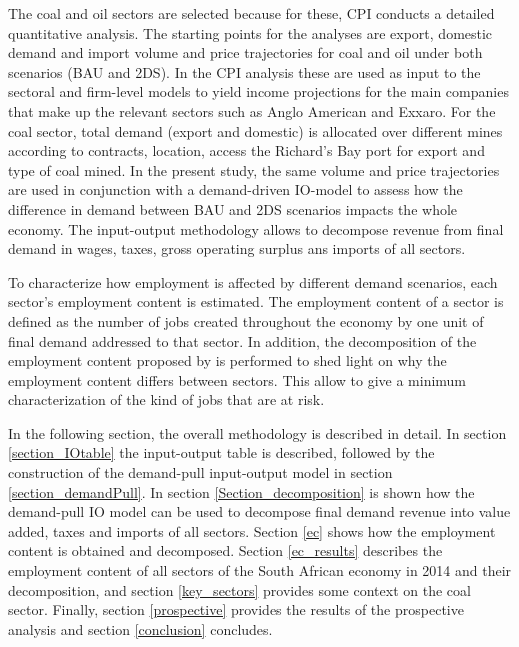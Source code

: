 \documentclass[12pt,english]{article}
\begin{document}
The coal and oil sectors are selected because for these, CPI conducts a detailed quantitative analysis. %
The starting points for the analyses are export, domestic demand and import volume and price trajectories for coal and oil under both scenarios (BAU and 2DS). In the CPI analysis these are used as input to the sectoral and firm-level models to yield income projections for the main companies that make up the relevant sectors such as Anglo American and Exxaro. For the coal sector, total demand (export and domestic) is allocated over different mines according to contracts, location, access the Richard's Bay port for export and type of coal mined. In the present study, the same volume and price trajectories are used in conjunction with a demand-driven IO-model to assess how the difference in demand between BAU and 2DS scenarios impacts the whole economy. The input-output methodology allows to decompose revenue from final demand in wages, taxes, gross operating surplus ans imports of all sectors.

To characterize how employment is affected by different demand scenarios, each sector's employment content is estimated. The employment content of a sector is defined as the number of jobs created throughout the economy by one unit of final demand addressed to that sector. In addition, the decomposition of the employment content proposed by \citep{perrier2017transition} is performed to shed light on why the employment content differs between sectors. This allow to give a minimum characterization of the kind of jobs that are at risk.

In the following section, the overall methodology is described in detail. In section \ref{section_IOtable} the input-output table is described, followed by the construction of the demand-pull input-output model in section \ref{section_demandPull}. In section \ref{Section_decomposition} is shown how the demand-pull IO model can be used to decompose final demand revenue into value added, taxes and imports of all sectors. Section \ref{ec} shows how the employment content is obtained and decomposed. Section \ref{ec_results} 
describes the employment content of all sectors of the South African economy in 2014 and their decomposition, and section \ref{key_sectors}
provides some context on the coal sector. Finally, section \ref{prospective} provides the results of the prospective analysis and section \ref{conclusion} concludes.
\end{document}
